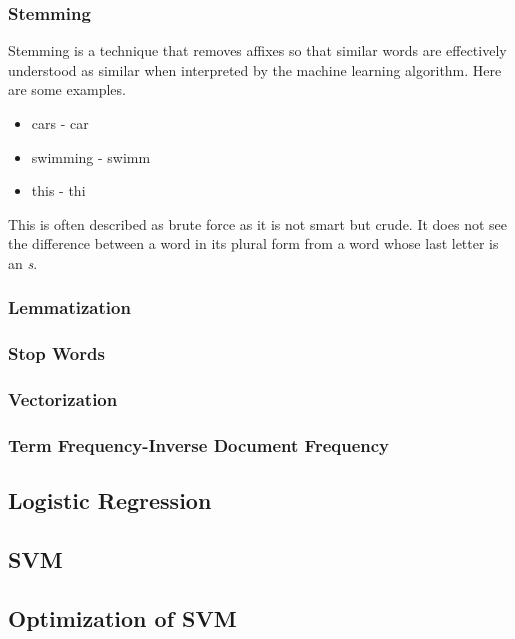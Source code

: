 \documentclass[11pt, a4paper, twocolumn]{article}
\begin{document}
\subsubsection{Stemming}
Stemming is a technique  that removes affixes so that similar words are effectively understood as similar when interpreted by the machine learning algorithm. Here are some examples.
\begin{itemize}
	\item cars - car
	\item swimming - swimm
	\item this - thi
\end{itemize}
This is often described as brute force as it is not smart but crude. It does not see the difference between a word in its plural form from a word whose last letter is an \textit{s}.
\subsubsection{Lemmatization}
\subsubsection{Stop Words}
\subsubsection{Vectorization}
\subsubsection{Term Frequency-Inverse Document Frequency}

\subsection{Logistic Regression}

\subsection{SVM}

\subsection{Optimization of SVM}
\end{document}
